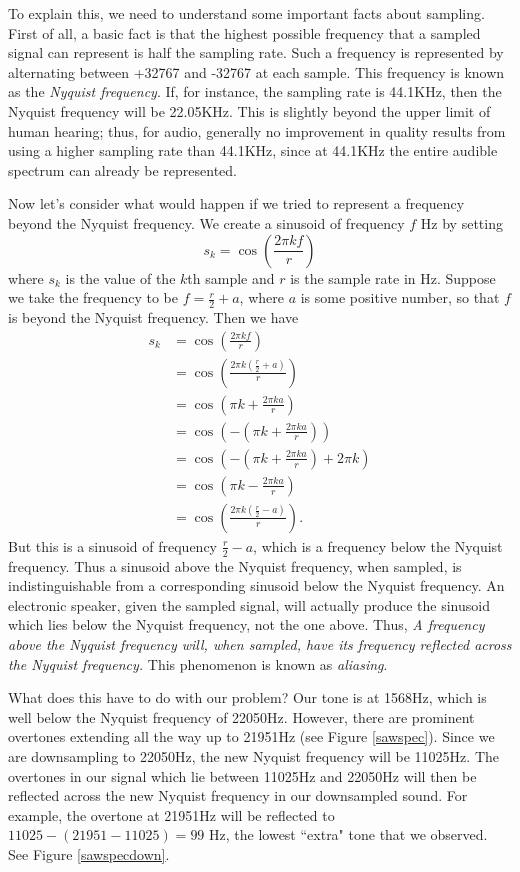To explain this, we need to understand some important facts about sampling. First of all, a basic fact is that the highest possible frequency that a sampled signal can represent is half the sampling rate. Such a frequency is represented by alternating between +32767 and -32767 at each sample. This frequency is known as the \emph{Nyquist frequency}. If, for instance, the sampling rate is 44.1KHz, then the Nyquist frequency will be 22.05KHz. This is slightly beyond the upper limit of human hearing; thus, for audio, generally no improvement in quality results from using a higher sampling rate than 44.1KHz, since at 44.1KHz the entire audible spectrum can already be represented.

Now let's consider what would happen if we tried to represent a frequency beyond the Nyquist frequency. We create a sinusoid of frequency $f$ Hz by setting
$$s_k = \cos\left(\frac{2\pi kf}r\right)$$
where $s_k$ is the value of the $k$th sample and $r$ is the sample rate in Hz. Suppose we take the frequency to be $f=\frac{r}2+a$, where $a$ is some positive number, so that $f$ is beyond the Nyquist frequency. Then we have
\begin{align*}
s_k &= \cos\left(\frac{2\pi kf}r\right) \\
&= \cos\left(\frac{2\pi k(\frac{r}2+a)}r\right)\\
&= \cos\left(\pi k+\frac{2\pi ka}r\right)\\
&= \cos\left(-\left(\pi k+\frac{2\pi ka}r\right)\right)\\
&= \cos\left(-\left(\pi k+\frac{2\pi ka}r\right)+2\pi k \right)\\
&= \cos\left(\pi k-\frac{2\pi ka}r\right)\\
&= \cos\left(\frac{2\pi k(\frac{r}2-a)}r\right).
\end{align*}
But this is a sinusoid of frequency $\frac{r}2-a$, which is a frequency below the Nyquist frequency. Thus a sinusoid above the Nyquist frequency, when sampled, is indistinguishable from a corresponding sinusoid below the Nyquist frequency. An electronic speaker, given the sampled signal, will actually produce the sinusoid which lies below the Nyquist frequency, not the one above. Thus,
\emph{A frequency above the Nyquist frequency will, when sampled, have its frequency reflected across the Nyquist frequency.}
This phenomenon is known as \emph{aliasing}.

What does this have to do with our problem? Our tone is at 1568Hz, which is well below the Nyquist frequency of 22050Hz. However, there are prominent overtones extending all the way up to 21951Hz (see Figure \ref{sawspec}). Since we are downsampling to 22050Hz, the new Nyquist frequency will be 11025Hz. The overtones in our signal which lie between 11025Hz and 22050Hz will then be reflected across the new Nyquist frequency in our downsampled sound. For example, the overtone at 21951Hz will be reflected to $11025-(21951-11025)=99$ Hz, the lowest ``extra" tone that we observed. See Figure \ref{sawspecdown}.

